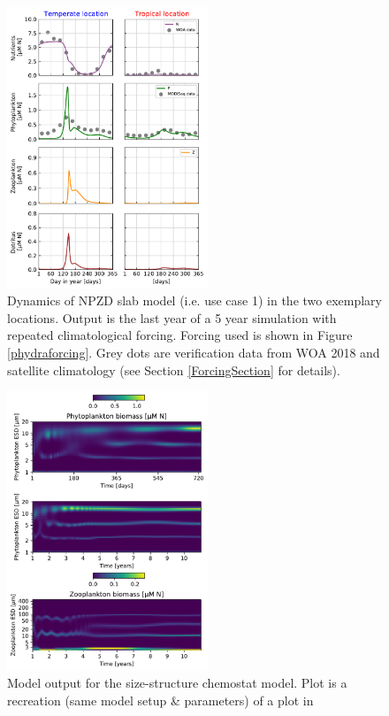 \documentclass[journal abbreviation, manuscript]{copernicus}
\begin{document}
\begin{figure}[t]
\includegraphics[width=6cm]{Figures/firstdraft_plots/02_NPZDslab.pdf}
\caption{Dynamics of NPZD slab model (i.e. use case 1) in the two exemplary locations. Output is the last year of a 5 year simulation with repeated climatological forcing. Forcing used is shown in Figure \ref{phydraforcing}. Grey dots are verification data from WOA 2018 and satellite climatology (see Section \ref{ForcingSection} for details).}
\label{NPZDslab_results}
\end{figure}

\begin{figure}[t]
\includegraphics[width=6cm]{Figures/firstdraft_plots/03_chemostat.pdf}
\caption{Model output for the size-structure chemostat model. Plot is a recreation (same model setup & parameters) of a plot in \citet{Banas2011b}}
\label{chemostat_plot}
\end{figure}
\end{document}
